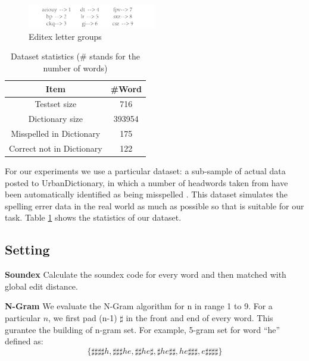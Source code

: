 \documentclass[11pt]{article}
\begin{document}
\begin{figure}
	\centering
	\includegraphics[width=0.5\textwidth]{img/editex.pdf}
	\caption{Editex letter groups}
	\label{fig:editex}
\end{figure}

\begin{table}
	\centering
	\begin{tabular}{c|c}
		\hline
		Item & \#Word \\
		\hline
		Testset size & 716 \\
		\hline
		Dictionary  size & 393954 \\
		\hline
		Misspelled in Dictionary & 175 \\
		\hline
		Correct not in Dictionary & 122 \\
		\hline
	\end{tabular}
	\caption{Dataset statistics (\# stands for the number of words)}
	\label{tab:dataset}
\end{table}

For our experiments we use a particular dataset:  a sub-sample of actual data posted to UrbanDictionary, in which a number of headwords taken from have been automatically identified as being misspelled \cite{Saphra2016EvaluatingIW}. This dataset simulates the spelling errer data in the real world as much as possible so that is suitable for our task. Table \ref{tab:dataset} shows the statistics of our dataset.

\subsection{Setting} 

\noindent\textbf{Soundex} Calculate the soundex code for every word and then matched with global edit distance.

\noindent\textbf{N-Gram} We evaluate the N-Gram algorithm for n in range 1 to 9. For a particular $n$, we first pad (n-1) $\sharp$ in the front and end of every word. This gurantee the building of n-gram set. For example, 5-gram set for word ``he'' defined as: 
\begin{equation}
\{\sharp\sharp\sharp\sharp h, \sharp\sharp\sharp he, \sharp\sharp he\sharp, \sharp he\sharp\sharp, he\sharp\sharp\sharp, e\sharp\sharp\sharp\sharp\}
\end{equation}
\end{document}
